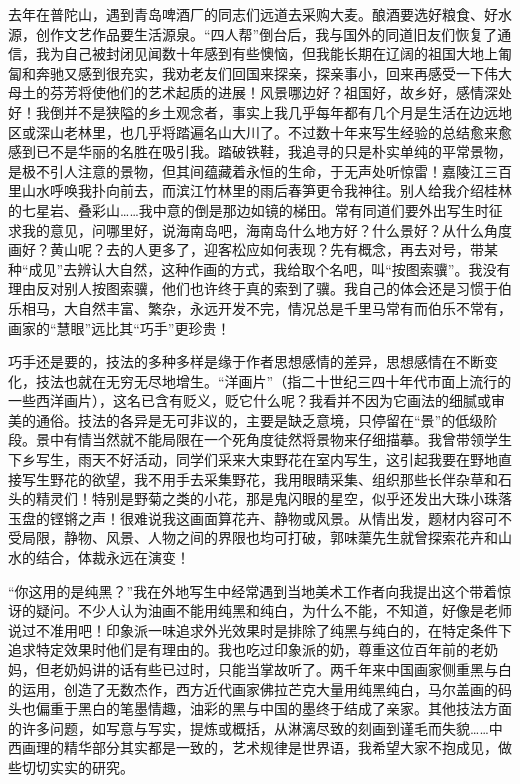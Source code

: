 \documentclass{article}
\begin{document}
去年在普陀山，遇到青岛啤酒厂的同志们远道去采购大麦。酿酒要选好粮食、好水源，创作文艺作品要生活源泉。“四人帮”倒台后，我与国外的同道旧友们恢复了通信，我为自己被封闭见闻数十年感到有些懊恼，但我能长期在辽阔的祖国大地上匍匐和奔驰又感到很充实，我劝老友们回国来探亲，探亲事小，回来再感受一下伟大母土的芬芳将使他们的艺术起质的进展！风景哪边好？祖国好，故乡好，感情深处好！我倒并不是狭隘的乡土观念者，事实上我几乎每年都有几个月是生活在边远地区或深山老林里，也几乎将踏遍名山大川了。不过数十年来写生经验的总结愈来愈感到已不是华丽的名胜在吸引我。踏破铁鞋，我追寻的只是朴实单纯的平常景物，是极不引人注意的景物，但其间蕴藏着永恒的生命，于无声处听惊雷！嘉陵江三百里山水呼唤我扑向前去，而滨江竹林里的雨后春笋更令我神往。别人给我介绍桂林的七星岩、叠彩山……我中意的倒是那边如镜的梯田。常有同道们要外出写生时征求我的意见，问哪里好，说海南岛吧，海南岛什么地方好？什么景好？从什么角度画好？黄山呢？去的人更多了，迎客松应如何表现？先有概念，再去对号，带某种“成见”去辨认大自然，这种作画的方式，我给取个名吧，叫“按图索骥”。我没有理由反对别人按图索骥，他们也许终于真的索到了骥。我自己的体会还是习惯于伯乐相马，大自然丰富、繁杂，永远开发不完，情况总是千里马常有而伯乐不常有，画家的“慧眼”远比其“巧手”更珍贵！

巧手还是要的，技法的多种多样是缘于作者思想感情的差异，思想感情在不断变化，技法也就在无穷无尽地增生。“洋画片”（指二十世纪三四十年代市面上流行的一些西洋画片），这名已含有贬义，贬它什么呢？我看并不因为它画法的细腻或审美的通俗。技法的各异是无可非议的，主要是缺乏意境，只停留在“景”的低级阶段。景中有情当然就不能局限在一个死角度徒然将景物来仔细描摹。我曾带领学生下乡写生，雨天不好活动，同学们采来大束野花在室内写生，这引起我要在野地直接写生野花的欲望，我不用手去采集野花，我用眼睛采集、组织那些长伴杂草和石头的精灵们！特别是野菊之类的小花，那是鬼闪眼的星空，似乎还发出大珠小珠落玉盘的铿锵之声！很难说我这画面算花卉、静物或风景。从情出发，题材内容可不受局限，静物、风景、人物之间的界限也均可打破，郭味蕖先生就曾探索花卉和山水的结合，体裁永远在演变！

“你这用的是纯黑？”我在外地写生中经常遇到当地美术工作者向我提出这个带着惊讶的疑问。不少人认为油画不能用纯黑和纯白，为什么不能，不知道，好像是老师说过不准用吧！印象派一味追求外光效果时是排除了纯黑与纯白的，在特定条件下追求特定效果时他们是有理由的。我也吃过印象派的奶，尊重这位百年前的老奶妈，但老奶妈讲的话有些已过时，只能当掌故听了。两千年来中国画家侧重黑与白的运用，创造了无数杰作，西方近代画家佛拉芒克大量用纯黑纯白，马尔盖画的码头也偏重于黑白的笔墨情趣，油彩的黑与中国的墨终于结成了亲家。其他技法方面的许多问题，如写意与写实，提炼或概括，从淋漓尽致的刻画到谨毛而失貌……中西画理的精华部分其实都是一致的，艺术规律是世界语，我希望大家不抱成见，做些切切实实的研究。
\end{document}
